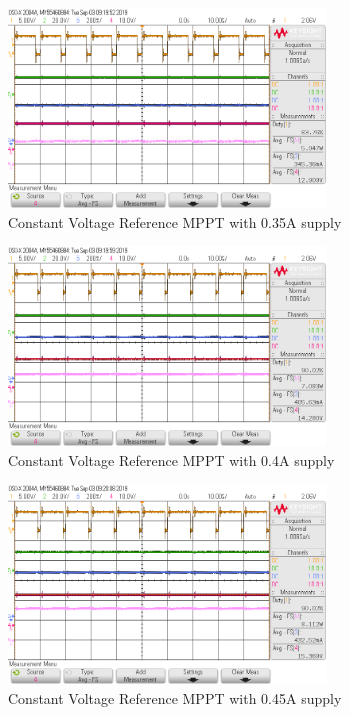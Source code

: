 \documentclass[]{article}
\begin{document}
				\begin{figure}[H]
					\centering
					\includegraphics[width=0.75\textwidth]{Lab3Results/0_35A_Supply}
					\caption{Constant Voltage Reference MPPT with 0.35A supply}
					\label{fig:Lab3_0.35A}
				\end{figure}
				\begin{figure}[H]
					\centering
					\includegraphics[width=0.75\textwidth]{Lab3Results/0_40A_Supply}
					\caption{Constant Voltage Reference MPPT with 0.4A supply}
					\label{fig:Lab3_0.4A}
				\end{figure}
				\begin{figure}[H]
					\centering
					\includegraphics[width=0.75\textwidth]{Lab3Results/0_45A_Supply}
					\caption{Constant Voltage Reference MPPT with 0.45A supply}
					\label{fig:Lab3_0.45A}
				\end{figure}
\end{document}
